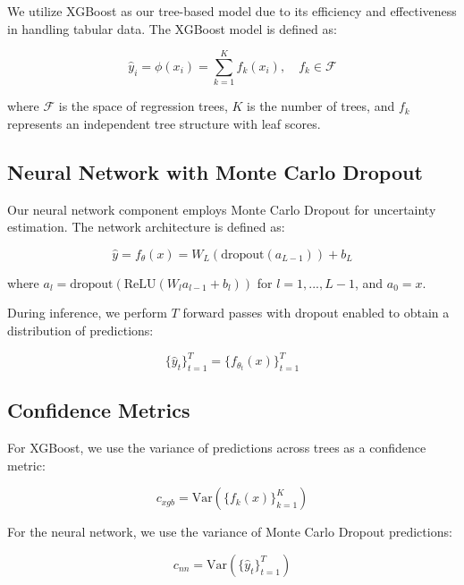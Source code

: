 \documentclass[10pt,journal,compsoc]{IEEEtran}
\begin{document}
We utilize XGBoost as our tree-based model due to its efficiency and effectiveness in handling tabular data. The XGBoost model is defined as:

\begin{equation}
    \hat{y}_i = \phi(x_i) = \sum_{k=1}^K f_k(x_i), \quad f_k \in \mathcal{F}
\end{equation}

where $\mathcal{F}$ is the space of regression trees, $K$ is the number of trees, and $f_k$ represents an independent tree structure with leaf scores.

\subsection{Neural Network with Monte Carlo Dropout}

Our neural network component employs Monte Carlo Dropout for uncertainty estimation. The network architecture is defined as:

\begin{equation}
    \hat{y} = f_\theta(x) = W_L(\text{dropout}(a_{L-1})) + b_L
\end{equation}

where $a_l = \text{dropout}(\text{ReLU}(W_l a_{l-1} + b_l))$ for $l = 1, ..., L-1$, and $a_0 = x$.

During inference, we perform $T$ forward passes with dropout enabled to obtain a distribution of predictions:

\begin{equation}
    \{\hat{y}_t\}_{t=1}^T = \{f_{\theta_t}(x)\}_{t=1}^T
\end{equation}

\subsection{Confidence Metrics}

For XGBoost, we use the variance of predictions across trees as a confidence metric:

\begin{equation}
    c_{xgb} = \text{Var}(\{f_k(x)\}_{k=1}^K)
\end{equation}

For the neural network, we use the variance of Monte Carlo Dropout predictions:

\begin{equation}
    c_{nn} = \text{Var}(\{\hat{y}_t\}_{t=1}^T)
\end{equation}
\end{document}
